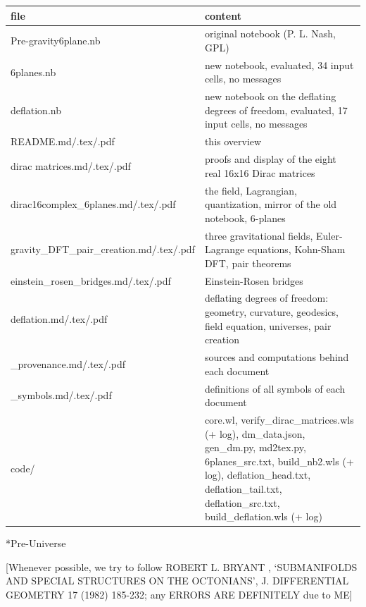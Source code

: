 \documentclass[10pt]{article}
\makeatletter
\newcommand\mdpart{\@startsection{section}{1}{\z@}{-3.5ex \@plus -1ex \@minus -.2ex}{2.3ex \@plus.2ex}{\normalfont\LARGE\bfseries\raggedright}}
\makeatother
\begin{document}
{\small\begin{longtable}{>{\raggedright\arraybackslash}p{}>{\raggedright\arraybackslash}p{}}\toprule
file & content \\\midrule\endhead
\bottomrule\endfoot
Pre-gravity6plane.nb & original notebook (P. L. Nash, GPL) \\
6planes.nb & new notebook, evaluated, 34 input cells, no messages \\
deflation.nb & new notebook on the deflating degrees of freedom, evaluated, 17 input cells, no messages \\
README.md/.tex/.pdf & this overview \\
dirac matrices.md/.tex/.pdf & proofs and display of the eight real 16x16 Dirac matrices \\
dirac16complex\_6planes.md/.tex/.pdf & the field, Lagrangian, quantization, mirror of the old notebook, 6-planes \\
gravity\_DFT\_pair\_creation.md/.tex/.pdf & three gravitational fields, Euler-Lagrange equations, Kohn-Sham DFT, pair theorems \\
einstein\_rosen\_bridges.md/.tex/.pdf & Einstein-Rosen bridges \\
deflation.md/.tex/.pdf & deflating degrees of freedom: geometry, curvature, geodesics, field equation, universes, pair creation \\
*\_provenance.md/.tex/.pdf & sources and computations behind each document \\
*\_symbols.md/.tex/.pdf & definitions of all symbols of each document \\
code/ & core.wl, verify\_dirac\_matrices.wls (+ log), dm\_data.json, gen\_dm.py, md2tex.py, 6planes\_src.txt, build\_nb2.wls (+ log), deflation\_head.txt, deflation\_tail.txt, deflation\_src.txt, build\_deflation.wls (+ log) \\
\end{longtable}}

\mdpart*{Pre-Universe}

[Whenever possible, we try to follow ROBERT L. BRYANT , `SUBMANIFOLDS AND SPECIAL STRUCTURES ON THE OCTONIANS', J. DIFFERENTIAL GEOMETRY 17 (1982) 185-232; any ERRORS ARE DEFINITELY due to ME]


\end{document}
